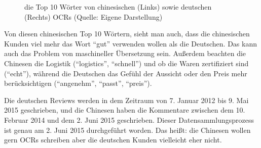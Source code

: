\begin{figure}[htb]
    \caption[die Top 10 Wörter von chinesischen (Links) sowie deutschen (Rechts) OCRs]{die Top 10 Wörter von chinesischen (Links) sowie deutschen (Rechts) \ac{OCRs} (Quelle: Eigene Darstellung)}
    \label{fig:top10}
\end{figure}

Von diesen chinesischen Top 10 Wörtern, sieht man auch, dass die chinesischen Kunden viel mehr das Wort ``gut'' verwenden wollen als die Deutschen. Das kann auch das Problem von maschineller Übersetzung sein. Außerdem beachten die Chinesen die Logistik (``logistics'', ``schnell'') und ob die Waren zertifiziert sind (``echt''), während die Deutschen das Gefühl der Aussicht oder den Preis mehr berücksichtigen (``angenehm'', ``passt'', ``preis'').

Die deutschen Reviews werden in dem Zeitraum von 7. Januar 2012 bis 9. Mai 2015 geschrieben, und die Chinesen haben die Kommentare zwischen dem 10. Februar 2014 und dem 2. Juni 2015 geschrieben. Dieser Datensammlungsprozess ist genau am 2. Juni 2015 durchgeführt worden. Das heißt: die Chinesen wollen gern \ac{OCRs} schreiben aber die deutschen Kunden vielleicht eher nicht.

